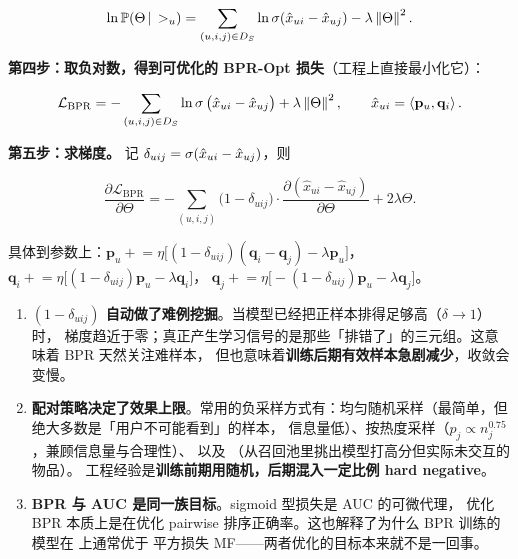 \begin{equation}
\ln \operatorname{\mathbb{P}}(\Theta \,\vert\, >_u) =
\sum_{(u,i,j) \in D_S} \ln \operatorname{\sigma}(\hat x_{ui} - \hat x_{uj}) - \lambda \left\lVert \Theta \right\rVert^2 .
\label{eq:bpr-logposterior}
\end{equation}

\textbf{第四步：取负对数，得到可优化的 BPR-Opt 损失}（工程上直接最小化它）：

\begin{equation}
\mathcal{L}_{\mathrm{BPR}} =
- \sum_{(u,i,j) \in D_S} \ln \operatorname{\sigma}\big( \hat x_{ui} - \hat x_{uj} \big)
+ \lambda \left\lVert \Theta \right\rVert^2 ,
\qquad
\hat x_{ui} = \left\langle \mathbf{p}_u, \mathbf{q}_i \right\rangle .
\label{eq:bpr-loss}
\end{equation}

\textbf{第五步：求梯度。} 记 $\delta_{uij} = \operatorname{\sigma}(\hat x_{ui} - \hat x_{uj})$，则

\begin{equation}
\frac{\partial \mathcal{L}_{\mathrm{BPR}}}{\partial \Theta} =
- \sum_{(u,i,j)} \big( 1 - \delta_{uij} \big) \cdot
\frac{\partial (\hat x_{ui} - \hat x_{uj})}{\partial \Theta} + 2 \lambda \Theta .
\label{eq:bpr-grad}
\end{equation}

具体到参数上：$\mathbf{p}_u \mathrel{+}= \eta \big[ (1-\delta_{uij})(\mathbf{q}_i - \mathbf{q}_j) - \lambda \mathbf{p}_u \big]$，
$\mathbf{q}_i \mathrel{+}= \eta \big[ (1-\delta_{uij}) \mathbf{p}_u - \lambda \mathbf{q}_i \big]$，
$\mathbf{q}_j \mathrel{+}= \eta \big[ -(1-\delta_{uij}) \mathbf{p}_u - \lambda \mathbf{q}_j \big]$。

\begin{insight}
\begin{enumerate}
  \item \textbf{$(1-\delta_{uij})$ 自动做了难例挖掘}。当模型已经把正样本排得足够高（$\delta \to 1$）时，
        梯度趋近于零；真正产生学习信号的是那些「排错了」的三元组。这意味着 BPR 天然关注难样本，
        但也意味着\textbf{训练后期有效样本急剧减少}，收敛会变慢。
  \item \textbf{配对策略决定了效果上限}。常用的负采样方式有：均匀随机采样（最简单，但绝大多数是「用户不可能看到」的样本，
        信息量低）、按热度采样（$p_j \propto n_j^{0.75}$，兼顾信息量与合理性）、
        以及 （从召回池里挑出模型打高分但实际未交互的物品）。
        工程经验是\textbf{训练前期用随机，后期混入一定比例 hard negative}。
  \item \textbf{BPR 与 AUC 是同一族目标}。sigmoid 型损失是 AUC 的可微代理，
        优化 BPR 本质上是在优化 pairwise 排序正确率。这也解释了为什么 BPR 训练的模型在  上通常优于
        平方损失 MF——两者优化的目标本来就不是一回事。
\end{enumerate}
\end{insight}

